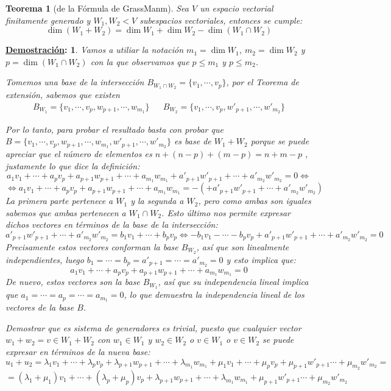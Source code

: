 \documentclass[10pt,a4paper,openright]{book}
\theoremstyle{break}
\newtheorem*{theo}{Teorema}
\newtheorem*{demo}{\underline{Demostración}:}
\begin{document}
\begin{theo}[de la Fórmula de GrassManm]
Sea $V$ un espacio vectorial finitamente generado y $W_1, W_2<V$ subespacios vectoriales, entonces se cumple:
$$
\dim (W_1+W_2)=\dim W_1+\dim W_2-\dim (W_1\cap W_2)
$$
\end{theo}
\begin{demo}
Vamos a utiliar la notación  $m_1=\dim W_1$, $m_2=\dim W_2$ y $p=\dim (W_1\cap W_2)$ con la que observamos que $p\leq m_1$ y $p\leq m_2$.

Tomemos una base de la intersección $B_{W_1\cap W_2} = \{v_1, \cdots, v_p\}$, por el Teorema de extensión, sabemos que existen
\begin{align*}
B_{W_1}=\{v_1, \cdots, v_p, w_{p+1}, \cdots, w_{m_1}\} & & B_{W_2}=\{v_1, \cdots, v_p, w'_{p+1}, \cdots, w'_{m_2}\}
\end{align*}

Por lo tanto, para probar el resultado basta con probar que $B=\{v_1, \cdots, v_p, w_{p+1}, \cdots, w_{m_1},w'_{p+1}, \cdots, w'_{m_2}\}$ es base de $W_1+W_2$ porque se puede apreciar que el número de elementos es $n+(n-p)+(m-p)=n+m-p$ , justamente lo que dice la definición:
$$
a_1v_1+\cdots+a_pv_p+a_{p+1}w_{p+1}+\cdots+a_{m_1}w_{m_1}+a'_{p+1}w'_{p+1}+\cdots+a'_{m_2}w'_{m_2}=0\Leftrightarrow
$$
$$
\Leftrightarrow a_1v_1+\cdots+a_pv_p+a_{p+1}w_{p+1}+\cdots+a_{m_1}w_{m_1}=-(+a'_{p+1}w'_{p+1}+\cdots+a'_{m_2}w'_{m_2})
$$
La primera parte pertenece a $W_1$ y la segunda a $W_2$, pero como ambas son iguales sabemos que ambas pertenecen a $W_1\cap W_2$. Esto último nos permite expresar dichos vectores en términos de la base de la intersección:
$$
a'_{p+1}w'_{p+1}+\cdots+a'_{m_2}w'_{m_2}=b_1v_1+\cdots+b_pv_p\Leftrightarrow -b_1v_1-\cdots-b_pv_p+a'_{p+1}w'_{p+1}+\cdots+a'_{m_2}w'_{m_2}=0
$$
Precisamente estos vectores conforman la base $B_{W_2}$, así que son linealmente independientes, luego $b_1=\cdots=b_p=a'_{p+1}=\cdots=a'_{m_2}=0$ y esto implica que:
$$
a_1v_1+\cdots+a_pv_p+a_{p+1}w_{p+1}+\cdots+a_{m_1}w_{m_1}=0
$$
De nuevo, estos vectores son la base $B_{W_1}$, así que su independencia lineal implica que $a_1=\cdots=a_p=\cdots=a_{m_1}=0$, lo que demuestra la independencia lineal de los vectores de la base $B$.

Demostrar que es sistema de generadores es trivial, puesto que cualquier vector $w_1+w_2=v\in W_1+W_2$ con $w_1\in W_1$ y $w_2\in W_2$ o $v\in W_1$ o $v\in W_2$ se puede expresar en términos de la nueva base:
$$
u_1+u_2=\lambda_1v_1+\cdots+\lambda_pv_p+\lambda_{p+1}w_{p+1}+\cdots+\lambda_{m_1}w_{m_1}+\mu_1v_1+\cdots+\mu_pv_p+\mu_{p+1}w'_{p+1}\cdots+\mu_{m_2}w'_{m_2}=$$
$$=(\lambda_1+\mu_1)v_1+\cdots+(\lambda_p+\mu_p)v_p+\lambda_{p+1}w_{p+1}+\cdots+\lambda_{m_1}w_{m_1}+\mu_{p+1}w'_{p+1}\cdots+\mu_{m_2}w'_{m_2}
$$
\end{demo}
\end{document}
